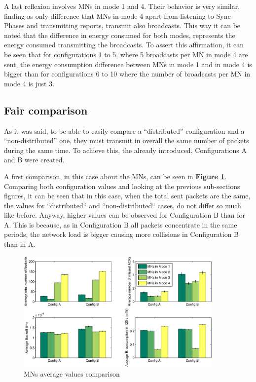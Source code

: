 A last reflexion involves \acp{MN} in mode 1 and 4. Their behavior is very similar, finding as only difference that \acp{MN} in mode 4 apart from 
listening to Sync Phases and transmitting reports, transmit also broadcasts. This way it can be noted that the difference in energy consumed for both
modes, represents the energy consumed transmitting the broadcasts. To assert this affirmation, it can be seen that for configurations 1 to 5, where
5 broadcasts per \ac{MN} in mode 4 are sent, the energy consumption difference between \acp{MN} in mode 1 and in mode 4 is bigger than for configurations
6 to 10 where the number of broadcasts per \ac{MN} in mode 4 is just 3.

\subsection{Fair comparison}

As it was said, to be able to easily compare a ``distributed'' configuration and a ``non-distributed'' one, they must transmit in overall the same
number of packets during the same time. To achieve this, the already introduced, Configurations A and B were created.

A first comparison, in this case about the \acp{MN}, can be seen in \textbf{Figure \ref{fig:MNsAverageValuesin120s}}. Comparing both
configuration values and looking at the previous sub-sections figures, it can be seen that in this case, when the total sent packets are the 
same, the values for ``distributed`` and ``non-distributed`` cases, do not differ so much like before. Anyway, higher values can be observed 
for Configuration B than for A. This is because, as in Configuration B all packets concentrate in the same periods, the network load is 
bigger causing more collisions in Configuration B than in A.

\begin{figure}[ht]
 \begin{center}
  \includegraphics[width=0.9\textwidth]{MNsAverageValuesin120s.eps}
 \end{center}
 \caption{\acp{MN} average values comparison}
 \label{fig:MNsAverageValuesin120s}
\end{figure}

